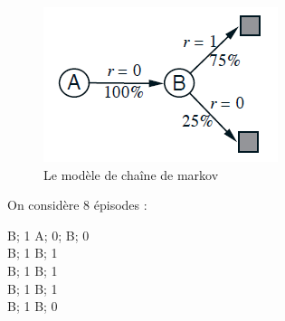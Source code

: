 \documentclass{beamer}	%
\theoremstyle{plain}
\theoremstyle{definition}
\newtheorem{eq}{Equation}[section]
\theoremstyle{remark}
\numberwithin{equation}{section}
\begin{document}

\begin{frame}
    \begin{figure}[h!]
    \centering
    \includegraphics[width=0.60 \textwidth,height=0.35\textheight]{photo/img.png}
    \caption{Le modèle de chaîne de markov}
    \label{fig:graphe1}
    \end{figure}

On considère 8 épisodes : 
	
	B; 1        \qquad \qquad A; 0; B; 0   \\
	B; 1        \qquad \qquad B; 1  \\
	B; 1        \qquad \qquad  B; 1  \\
	B; 1        \qquad \qquad B; 1  \\
	B; 1        \qquad \qquad B; 0  \\

\end{frame}
\end{document}

